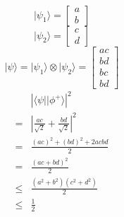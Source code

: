 \documentclass{assignment}
\newcommand{\ket}[1]{\ensuremath{|{#1}\rangle}}
\newcommand{\bra}[1]{\ensuremath{\langle{#1}|}}
\begin{document}
\begin{problemlist}
  \clearpage
  \pbitem
  \begin{problem}
  \end{problem}
  \begin{answer}
    \\
    \[
    \ket{\psi_1}=
    \begin{bmatrix}
      a\\
      b
    \end{bmatrix}
    \]
    \[
    \ket{\psi_2}=
    \begin{bmatrix}
      c\\
      d
    \end{bmatrix}
    \]
    \[
    \ket{\psi}=\ket{\psi_1}\otimes \ket{\psi_2}=
    \begin{bmatrix}
      ac\\
      bd\\
      bc\\
      bd
    \end{bmatrix}
    \]
    \begin{align*}
      &|\bra{\psi}\ket{\phi^+}|^2\\
      =&|\frac{ac}{\sqrt{2}} + \frac{bd}{\sqrt{2}}|^2\\
      =&\frac{(ac)^2 + (bd)^2 + 2acbd}{2}\\
      =&\frac{(ac + bd)^2}{2}\\
      \le&\frac{(a^2 + b^2)(c^2+d^2)}{2}\\
      \le&\frac{1}{2}\\
    \end{align*}
  \end{answer}
  
\end{problemlist}
\end{document}
